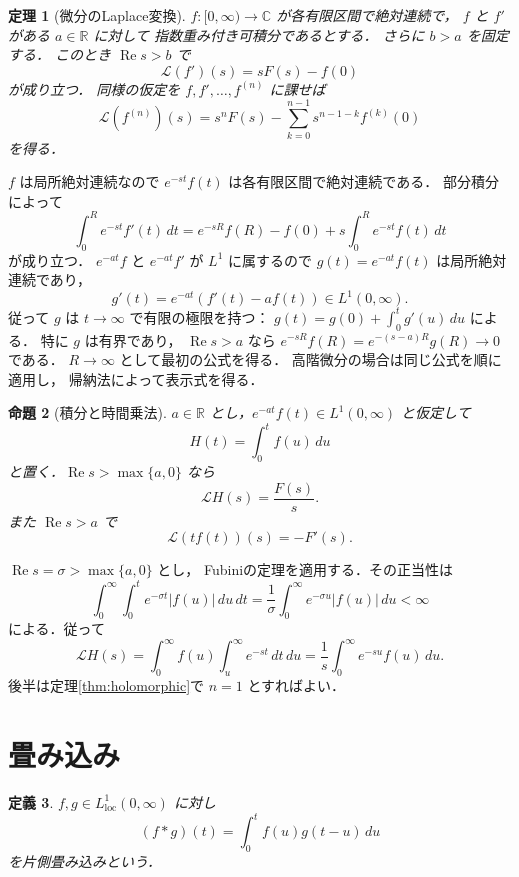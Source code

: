 \documentclass[a5paper,10pt,onecolumn]{jsarticle}
\makeatletter
\theoremstyle{mathnotetheorem}
\newtheorem{theorem}{定理}[section]
\newtheorem{definition}[theorem]{定義}
\newtheorem{proposition}[theorem]{命題}
\renewcommand{\proofname}{証明}
\renewenvironment{proof}[1][\proofname]{%
  \par\pushQED{\qed}\normalfont\topsep4\p@\@plus2\p@\relax
  \trivlist\item[\hskip\labelsep\bfseries #1]\ignorespaces
}{\popQED\endtrivlist\@endpefalse}
\makeatother
\begin{document}
\begin{theorem}[微分のLaplace変換]\label{thm:derivatives}
$f:[0,\infty)\to\mathbb C$ が各有限区間で絶対連続で，
$f$ と $f'$ がある $a\in\mathbb R$ に対して
指数重み付き可積分であるとする．
さらに $b>a$ を固定する．
このとき $\operatorname{Re}s>b$ で
\[
 \mathcal L(f')(s)=sF(s)-f(0)
\]
が成り立つ．
同様の仮定を $f,f',\dots,f^{(n)}$ に課せば
\[
 \mathcal L(f^{(n)})(s)
 =s^nF(s)-\sum_{k=0}^{n-1}
 s^{n-1-k}f^{(k)}(0)
\]
を得る．
\end{theorem}
\begin{proof}
$f$ は局所絶対連続なので
$e^{-st}f(t)$ は各有限区間で絶対連続である．
部分積分によって
\[
 \int_0^R e^{-st}f'(t)\,dt
 =e^{-sR}f(R)-f(0)
 +s\int_0^R e^{-st}f(t)\,dt
\]
が成り立つ．
$e^{-a t}f$ と $e^{-a t}f'$ が $L^1$ に属するので
$g(t)=e^{-at}f(t)$ は局所絶対連続であり，
\[
 g'(t)=e^{-at}(f'(t)-af(t))\in L^1(0,\infty).
\]
従って $g$ は $t\to\infty$ で有限の極限を持つ：
$g(t)=g(0)+\int_0^t g'(u)\,du$ による．
特に $g$ は有界であり，
$\operatorname{Re}s>a$ なら
$e^{-sR}f(R)=e^{-(s-a)R}g(R)\to0$ である．
$R\to\infty$ として最初の公式を得る．
高階微分の場合は同じ公式を順に適用し，
帰納法によって表示式を得る．
\end{proof}

\begin{proposition}[積分と時間乗法]\label{prop:integration}
$a\in\mathbb R$ とし，$e^{-at}f(t)\in L^1(0,\infty)$ と仮定して
\[
 H(t)=\int_0^t f(u)\,du
\]
と置く．$\operatorname{Re}s>\max\{a,0\}$ なら
\[
 \mathcal LH(s)=\frac{F(s)}s.
\]
また $\operatorname{Re}s>a$ で
\[
 \mathcal L(tf(t))(s)=-F'(s).
\]
\end{proposition}
\begin{proof}
$\operatorname{Re}s=\sigma>\max\{a,0\}$ とし，
Fubiniの定理を適用する．その正当性は
\[
 \int_0^\infty\int_0^t
 e^{-\sigma t}|f(u)|\,du\,dt
 =\frac1\sigma\int_0^\infty e^{-\sigma u}|f(u)|\,du<\infty
\]
による．従って
\[
 \mathcal LH(s)
 =\int_0^\infty f(u)\int_u^\infty e^{-st}\,dt\,du
 =\frac1s\int_0^\infty e^{-su}f(u)\,du.
\]
後半は定理\ref{thm:holomorphic}で $n=1$ とすればよい．
\end{proof}

\section{畳み込み}

\begin{definition}
$f,g\in L^1_{\mathrm{loc}}(0,\infty)$ に対し
\[
 (f*g)(t)=\int_0^t f(u)g(t-u)\,du
\]
を片側畳み込みという．
\end{definition}
\end{document}
